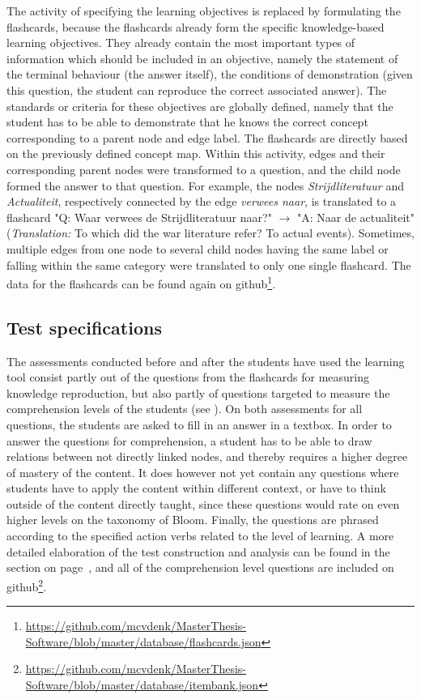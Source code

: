 The activity of specifying the learning objectives is replaced by formulating the flashcards, because the flashcards already form the specific knowledge-based learning objectives. They already contain the most important types of information which should be included in an objective, namely the statement of the terminal behaviour (the answer itself), the conditions of demonstration (given this question, the student can reproduce the correct associated answer). The standards or criteria for these objectives are globally defined, namely that the student has to be able to demonstrate that he knows the correct concept corresponding to a parent node and edge label. The flashcards are directly based on the previously defined concept map. Within this activity, edges and their corresponding parent nodes were transformed to a question, and the child node formed the answer to that question. For example, the nodes \emph{Strijdliteratuur} and \emph{Actualiteit}, respectively connected by the edge \emph{verwees naar}, is translated to a flashcard "Q: Waar verwees de Strijdliteratuur naar?" $\rightarrow$ "A: Naar de actualiteit" (\emph{Translation:} To which did the war literature refer? To actual events). Sometimes, multiple edges from one node to several child nodes having the same label or falling within the same category were translated to only one single flashcard. The data for the flashcards can be found again on github\footnote{\url{https://github.com/mcvdenk/MasterThesis-Software/blob/master/database/flashcards.json}}.

\subsection{Test specifications}

The assessments conducted before and after the students have used the learning tool consist partly out of the questions from the flashcards for measuring knowledge reproduction, but also partly of questions targeted to measure the comprehension levels of the students (see ). On both assessments for all questions, the students are asked to fill in an answer in a textbox. In order to answer the questions for comprehension, a student has to be able to draw relations between not directly linked nodes, and thereby requires a higher degree of mastery of the content. It does however not yet contain any questions where students have to apply the content within different context, or have to think outside of the content directly taught, since these questions would rate on even higher levels on the taxonomy of Bloom. Finally, the questions are phrased according to the specified action verbs related to the level of learning. A more detailed elaboration of the test construction and analysis can be found in the  section on page~\pageref{sec:instrumentation}, and all of the comprehension level questions are included on github\footnote{\url{https://github.com/mcvdenk/MasterThesis-Software/blob/master/database/itembank.json}}.
